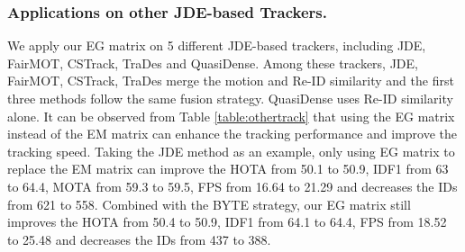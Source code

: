 \documentclass[runningheads]{llncs}
\begin{document}
\subsubsection{Applications on other JDE-based Trackers.}
We apply our EG matrix on 5 different JDE-based trackers, including JDE\cite{wang2020towards}, FairMOT\cite{zhang2021fairmot}, CSTrack\cite{liang2020rethinking}, TraDes\cite{wu2021track} and QuasiDense\cite{pang2021quasi}. Among these trackers, JDE, FairMOT, CSTrack, TraDes merge the motion and Re-ID similarity and the first three methods follow the same fusion strategy. QuasiDense uses Re-ID similarity alone. It can be observed from Table \ref{table:othertrack} that using the EG matrix instead of the EM matrix can enhance the tracking performance and improve the tracking speed. Taking the JDE\cite{wang2020towards} method as an example, only using EG matrix to replace the EM matrix can improve the HOTA from 50.1 to 50.9, IDF1 from 63 to 64.4, MOTA from 59.3 to 59.5, FPS from 16.64 to 21.29 and decreases the IDs from 621 to 558. Combined with the BYTE strategy, our EG matrix still improves the HOTA from 50.4 to 50.9, IDF1 from 64.1 to 64.4, FPS from 18.52 to 25.48 and decreases the IDs from 437 to 388.
\setlength{\tabcolsep}{4pt}
\end{document}
